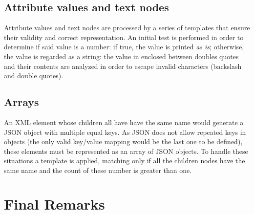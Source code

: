 \documentclass[twocolumn,twoside,10pt,a4paper]{article}
\begin{document}
\subsection{Attribute values and text nodes}

Attribute values and text nodes are processed by a series of templates that ensure their validity and correct representation\cite{json_format}. An initial test is performed in order to determine if said value is a number: if true, the value is printed \textit{as is}; otherwise, the value is regarded as a string: the value in enclosed between doubles quotes and their contents are analyzed in order to escape invalid characters (backslash and double quotes).

\subsection{Arrays}

An XML element whose children all have have the same name would generate a JSON object with multiple equal keys. As JSON does not allow repeated keys in objects (the only valid key/value mapping would be the last one to be defined), these elements must be represented as an array of JSON objects. To handle these situations a template is applied, matching only if all the children nodes have the same name and the count of these number is greater than one.

\section{Final Remarks}\label{sec:final-remarks}

\renewcommand{\bibname}{References}


\end{document}
